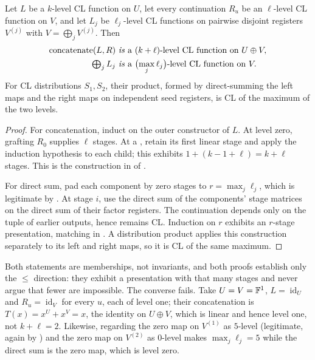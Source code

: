 \begin{lemma}
\label{lem:level-laws}
Let \(L\) be a \(k\)-level CL function on \(U\), let every continuation
\(R_u\) be an \(\ell\)-level CL function on \(V\), and let \(L_j\) be
\(\ell_j\)-level CL functions on pairwise disjoint registers \(V^{(j)}\) with
\(V=\bigoplus_jV^{(j)}\).  Then
\[
\begin{aligned}
 \operatorname{concatenate}(L,R)&\ \text{\emph{is} a }(k+\ell)\text{-level CL
   function on }U\oplus V,\\
 \textstyle\bigoplus_jL_j&\ \text{\emph{is} a }\bigl(\max_j\ell_j\bigr)
   \text{-level CL function on }V.
\end{aligned}
\]
For CL distributions \(S_1,S_2\), their product, formed by direct-summing the
left maps and the right maps on independent seed registers, is CL of the
maximum of the two levels.
\end{lemma}

\begin{proof}
For concatenation, induct on the outer constructor of \(L\).  At level zero,
grafting \(R_0\) supplies \(\ell\) stages.  At a , retain
its first linear stage and apply the induction hypothesis to each child; this
exhibits \(1+(k-1+\ell)=k+\ell\) stages.  This is the construction in
 of .

For direct sum, pad each component by zero stages to
\(r=\max_j\ell_j\), which is legitimate by .  At stage
\(i\), use the direct sum of the components' stage matrices on the direct sum
of their factor registers.  The continuation
depends only on the tuple of earlier outputs, hence remains CL.  Induction on
\(r\) exhibits an \(r\)-stage presentation, matching  in
.  A distribution product applies this
construction separately to its left and right maps, so it is CL of the same
maximum.
\end{proof}

Both statements are memberships, not invariants, and both proofs establish only
the \(\leq\) direction: they exhibit a presentation with that many stages and
never argue that fewer are impossible.  The converse fails.  Take
\(U=V=\mathbb F^1\), \(L=\operatorname{id}_U\) and \(R_u=\operatorname{id}_V\) for
every \(u\), each of level one; their concatenation is
\(T(x)=x^U+x^V=x\), the identity on \(U\oplus V\), which is linear and hence
level one, not \(k+\ell=2\).  Likewise, regarding the zero map on \(V^{(1)}\)
as \(5\)-level (legitimate, again by ) and the zero map
on \(V^{(2)}\) as \(0\)-level makes \(\max_j\ell_j=5\) while the direct sum is
the zero map, which is level zero.

